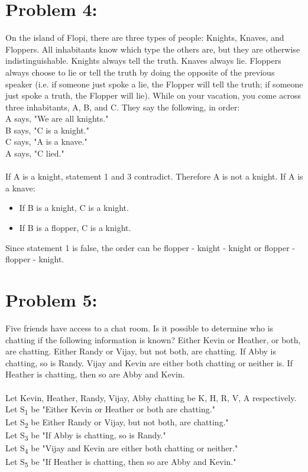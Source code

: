 \documentclass[12pt,en,a4paper]{article}
\begin{document}
	\section*{Problem 4:}
	On the island of Flopi, there are three types of people: Knights, Knaves, and Floppers.
	All inhabitants know which type the others are, but they are otherwise indistinguishable. Knights always
	tell the truth. Knaves always lie. Floppers always choose to lie or tell the truth by doing the opposite of
	the previous speaker (i.e. if someone just spoke a lie, the 
Flopper will tell the truth; if someone just spoke a
	truth, the 
Flopper will lie). While on your vacation, you come across three inhabitants, A, B, and C. They
	say the following, in order:\\
	A says, "We are all knights."\\
	B says, "C is a knight."\\
	C says, "A is a knave."\\
	A says, "C lied."\\\\
	If A is a knight, statement 1 and 3 contradict. Therefore A is not a knight.	
	If A is a knave:
	\begin{itemize}
		\item If B is a knight, C is a knight.
		\item If B is a flopper, C is a knight.
	\end{itemize}
	Since statement 1 is false, the order can be flopper - knight - knight or flopper - flopper - knight.
\newpage
{}
	\section*{Problem 5:}
	Five friends have access to a chat room. Is it possible to determine who is chatting if
	the following information is known? Either Kevin or Heather, or both, are chatting. Either Randy or Vijay,
	but not both, are chatting. If Abby is chatting, so is Randy. Vijay and Kevin are either both chatting or
	neither is. If Heather is chatting, then so are Abby and Kevin.\\\\
	Let Kevin, Heather, Randy, Vijay, Abby chatting be K, H, R, V, A respectively.\\
	Let S\textsubscript{1} be "Either Kevin or Heather or both are chatting."\\
	Let S\textsubscript{2} be Either Randy or Vijay, but not both, are chatting."\\
	Let S\textsubscript{3} be "If Abby is chatting, so is Randy."\\
	Let S\textsubscript{4} be "Vijay and Kevin are either both chatting or neither."\\
	Let S\textsubscript{5} be "If Heather is chatting, then so are Abby and Kevin."
	
\end{document}
